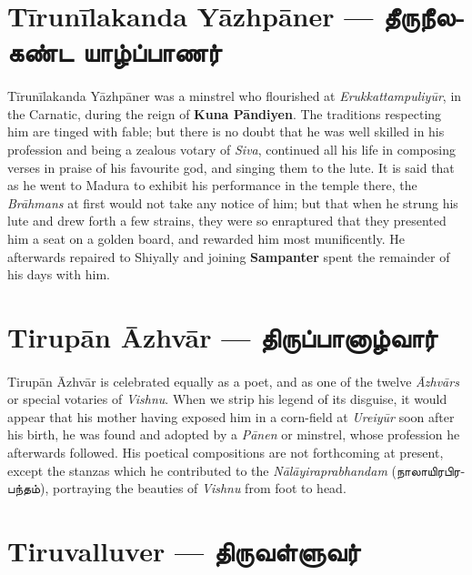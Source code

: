 \documentclass{article}
\newcommand{\TamilText}[1]{\texttamil{#1}}
\newcommand{\TamilBold}[1]{\texttamil{\textbf{#1}}}
\newcommand{\tam}[1]{\TamilText{#1}}
\newcommand{\tambold}[1]{\TamilBold{#1}}
\begin{document}
\section{T\={i}run\={i}lakanda Y\={a}zhp\={a}ner --- \tambold{தீருநீலகண்ட யாழ்ப்பாணர்}}
\paragraph{}
T\={i}run\={i}lakanda Y\={a}zhp\={a}ner was a minstrel who flourished at \emph{Erukkattampuliy\={u}r}, in the Carnatic, during the reign of \textbf{Kuna P\={a}ndiyen}. The traditions respecting him are tinged with fable; but there is no doubt that he was well skilled in his profession and being a zealous votary of \emph{Siva}, continued all his life in composing verses in praise of his favourite god, and singing them to the lute. It is said that as he went to Madura to exhibit his performance in the temple there, the \emph{Br\={a}hmans} at first would not take any notice of him; but that when he strung his lute and drew forth a few strains, they were so enraptured that they presented him a seat on a golden board, and rewarded him most munificently. He afterwards repaired to Shiyally and joining \textbf{Sampanter} spent the remainder of his days with him.

\section{Tirup\={a}n \={A}zhv\={a}r --- \tambold{திருப்பானாழ்வார்}}
\paragraph{}
Tirup\={a}n \={A}zhv\={a}r is celebrated equally as a poet, and as one of the twelve \emph{\={A}zhv\={a}rs} or special votaries of \emph{Vishnu}. When we strip his legend of its disguise, it would appear that his mother having exposed him in a corn-field at \emph{Ureiy\={u}r} soon after his birth, he was found and adopted by a \emph{P\={a}nen} or minstrel, whose profession he afterwards followed. His poetical compositions are not forthcoming at present, except the stanzas which he contributed to the \emph{N\={a}l\={a}yiraprabhandam} (\tam{நாலாயிரபிரபந்தம்}), portraying the beauties of \emph{Vishnu} from foot to head.

\section{Tiruvalluver --- \tambold{திருவள்ளுவர்}}
\end{document}
